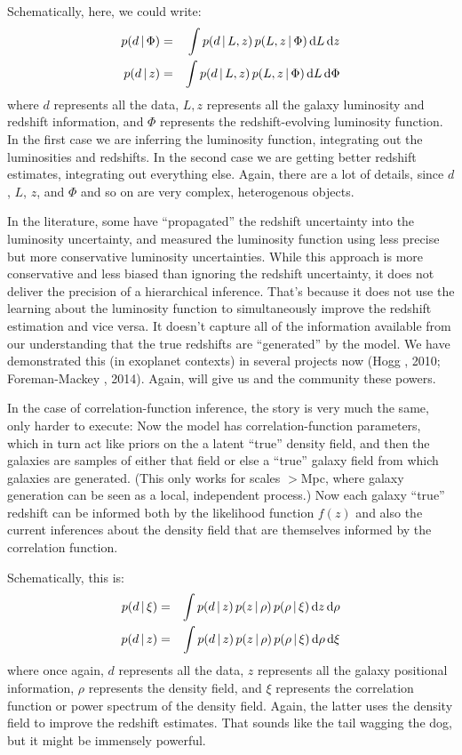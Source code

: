 \documentclass[12pt]{article}
\newcommand{\dd}{\mathrm{d}}
\begin{document}
Schematically, here, we could write:
\begin{eqnarray}
p(d\given \Phi) &=& \int p(d\given L, z)\,p(L, z\given \Phi)\,\dd L\,\dd z \\
p(d\given z) &=& \int p(d\given L, z)\,p(L, z\given \Phi)\,\dd L\,\dd\Phi
\end{eqnarray}
where $d$ represents all the data, $L, z$ represents all the galaxy
luminosity and redshift information, and $\Phi$ represents the redshift-evolving luminosity function.
In the first case we are inferring the luminosity function, integrating out
the luminosities and redshifts.
In the second case we are getting better redshift estimates, integrating out
everything else.
Again, there are a lot of details, since $d$, $L$, $z$, and $\Phi$ and so on are very
complex, heterogenous objects.

In the literature, some have ``propagated'' the redshift uncertainty
into the luminosity uncertainty, and measured the luminosity function
using less precise but more conservative luminosity uncertainties.
While this approach is more conservative and less biased than ignoring
the redshift uncertainty, it does not deliver the precision of a
hierarchical inference.
That's because it does not use the learning about the luminosity
function to simultaneously improve the redshift estimation and vice
versa.
It doesn't capture all of the information available from our understanding
that the true redshifts are ``generated'' by the model.
We have demonstrated this (in exoplanet contexts) in several projects
now (Hogg \etal, 2010; Foreman-Mackey \etal, 2014).
Again,  will give us and the community these powers.

In the case of correlation-function inference, the story is very much
the same, only harder to execute:
Now the model has correlation-function parameters, which in turn act
like priors on the a latent ``true'' density field, and then the
galaxies are samples of either that field or else a ``true'' galaxy
field from which galaxies are generated.
(This only works for scales $>$Mpc, where galaxy generation can be
seen as a local, independent process.)
Now each galaxy ``true'' redshift can be informed both by the likelihood
function $f(z)$ and also the current inferences about the density field
that are themselves informed by the correlation function.

Schematically, this is:
\begin{eqnarray}
p(d\given \xi) &=& \int p(d\given z)\,p(z\given \rho)\,p(\rho\given \xi)\,\dd z\,\dd\rho \\
p(d\given z) &=& \int p(d\given z)\,p(z\given \rho)\,p(\rho\given \xi)\,\dd\rho\,\dd\xi
\end{eqnarray}
where once again, $d$ represents all the data, $z$ represents all the galaxy
positional information, $\rho$ represents the density field, and $\xi$
represents the correlation function or power spectrum of the density
field.  Again, the latter uses the density field to improve the redshift estimates.
That sounds like the tail wagging the dog, but it might be immensely powerful.
\end{document}
